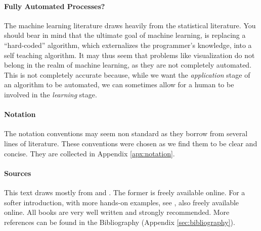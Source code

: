 \paragraph{Fully Automated Processes?}
The machine learning literature draws heavily from the statistical literature. 
You should bear in mind that the ultimate goal of machine learning, is replacing a ``hard-coded'' algorithm, which externalizes the programmer's knowledge, into a self teaching algorithm. 
It may thus seem that problems like visualization do not belong in the realm of machine learning, as they are not completely automated.
This is not completely accurate because, while we want the \emph{application} stage of an algorithm to be automated, we can sometimes allow for a human to be involved in the \emph{learning} stage. 


\paragraph{Notation}
The notation conventions may seem non standard as they borrow from several lines of literature. 
These conventions were chosen as we find them to be clear and concise.
They are collected in Appendix \ref{apx:notation}.

\paragraph{Sources}
This text draws mostly from \cite{hastie_elements_2003} and \cite{shalev-shwartz_understanding_2014}.
The former is freely available online.
For a softer introduction, with more hands-on examples, see \cite{james_introduction_2013}, also freely available online.
All books are very well written and strongly recommended.
More references can be found in the Bibliography (Appendix \ref{sec:bibliography}).

